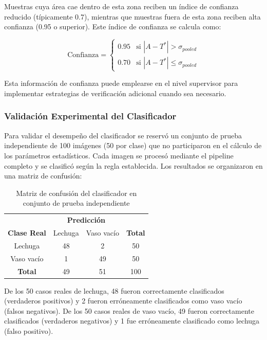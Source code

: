 Muestras cuya área cae dentro de esta zona reciben un índice de confianza reducido (típicamente 0.7), mientras que muestras fuera de esta zona reciben alta confianza (0.95 o superior). Este índice de confianza se calcula como:

\begin{equation}
\text{Confianza} = \begin{cases}
0.95 & \text{si } |A - T^*| > \sigma_{pooled} \\
0.70 & \text{si } |A - T^*| \leq \sigma_{pooled}
\end{cases}
\end{equation}

Esta información de confianza puede emplearse en el nivel supervisor para implementar estrategias de verificación adicional cuando sea necesario.

\subsubsection{Validación Experimental del Clasificador}

Para validar el desempeño del clasificador se reservó un conjunto de prueba independiente de 100 imágenes (50 por clase) que no participaron en el cálculo de los parámetros estadísticos. Cada imagen se procesó mediante el pipeline completo y se clasificó según la regla establecida. Los resultados se organizaron en una matriz de confusión:

\begin{table}[h]
\centering
\begin{tabular}{|c|c|c|c|}
\hline
 & \multicolumn{2}{c|}{\textbf{Predicción}} & \\ \cline{2-3}
\textbf{Clase Real} & Lechuga & Vaso vacío & \textbf{Total} \\ \hline
Lechuga & 48 & 2 & 50 \\ \hline
Vaso vacío & 1 & 49 & 50 \\ \hline
\textbf{Total} & 49 & 51 & 100 \\ \hline
\end{tabular}
\caption{Matriz de confusión del clasificador en conjunto de prueba independiente}
\label{tab:matriz_confusion}
\end{table}

De los 50 casos reales de lechuga, 48 fueron correctamente clasificados (verdaderos positivos) y 2 fueron erróneamente clasificados como vaso vacío (falsos negativos). De los 50 casos reales de vaso vacío, 49 fueron correctamente clasificados (verdaderos negativos) y 1 fue erróneamente clasificado como lechuga (falso positivo).

